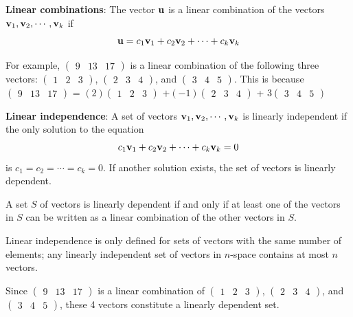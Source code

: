 \documentclass[
]{book}
\theoremstyle{definition}
\theoremstyle{definition}
\theoremstyle{definition}
\theoremstyle{definition}
\theoremstyle{remark}
\begin{document}
\textbf{Linear combinations}: The vector \({\bf u}\) is a linear combination of the vectors \({\bf v}_1, {\bf v}_2, \cdots , {\bf v}_k\) if
\[{\bf u} = c_1{\bf v}_1 + c_2{\bf v}_2 +  \cdots + c_k{\bf v}_k\]

For example, \(\begin{pmatrix}9 & 13 & 17 \end{pmatrix}\) is a linear combination of the following three vectors: \(\begin{pmatrix}1 & 2 & 3 \end{pmatrix}\), \(\begin{pmatrix} 2 & 3& 4\end{pmatrix}\), and \(\begin{pmatrix} 3 & 4 & 5 \end{pmatrix}\). This is because \(\begin{pmatrix}9 & 13 & 17 \end{pmatrix}\) = \((2)\begin{pmatrix}1 & 2 & 3 \end{pmatrix}\) \(+ (-1)\begin{pmatrix} 2 & 3& 4\end{pmatrix}\) + \(3\begin{pmatrix} 3 & 4 & 5 \end{pmatrix}\)

\textbf{Linear independence}: A set of vectors \({\bf v}_1, {\bf v}_2, \cdots , {\bf v}_k\) is linearly independent if the only solution to the equation
\[c_1{\bf v}_1 + c_2{\bf v}_2 +  \cdots + c_k{\bf v}_k = 0\]
is \(c_1 = c_2 = \cdots = c_k = 0\). If another solution exists, the set of vectors is linearly dependent.

A set \(S\) of vectors is linearly dependent if and only if at least one of the vectors in \(S\) can be written as a linear combination of the other vectors in \(S\).

Linear independence is only defined for sets of vectors with the same number of elements; any linearly independent set of vectors in \(n\)-space contains at most \(n\) vectors.

Since \(\begin{pmatrix}9 & 13 & 17 \end{pmatrix}\) is a linear combination of \(\begin{pmatrix}1 & 2 & 3 \end{pmatrix}\), \(\begin{pmatrix} 2 & 3& 4\end{pmatrix}\), and \(\begin{pmatrix} 3 & 4 & 5 \end{pmatrix}\), these 4 vectors constitute a linearly dependent set.
\end{document}
